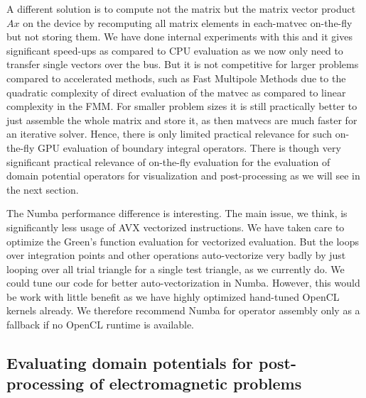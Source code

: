 A different solution is to compute not the matrix but the matrix vector product $Ax$ on the device by recomputing all matrix elements in each-matvec on-the-fly but not storing them. We have done internal experiments with this and it gives significant speed-ups as compared to CPU evaluation as we now only need to transfer single vectors over the bus. But it is not competitive for larger problems compared to accelerated methods, such as Fast Multipole Methods due to the quadratic complexity of direct evaluation of the matvec as compared to linear complexity in the FMM. For smaller problem sizes it is still practically better to just assemble the whole matrix and store it, as then matvecs are much faster for an iterative solver. Hence, there is only limited practical relevance for such on-the-fly GPU evaluation of boundary integral operators. There is though very significant practical relevance of on-the-fly evaluation for the evaluation of domain potential operators for visualization and post-processing as we will see in the next section.

The Numba performance difference is interesting. The main issue, we think, is significantly less usage of AVX vectorized instructions. We have taken care to optimize the Green's function evaluation for vectorized evaluation. But the loops over integration points and other operations auto-vectorize very badly by just looping over all trial triangle for a single test triangle, as we currently do. We could tune our code for better auto-vectorization in Numba. However, this would be work with little benefit as we have highly optimized hand-tuned OpenCL kernels already. We therefore recommend Numba for operator assembly only as a fallback if no OpenCL runtime is available.

\subsection{Evaluating domain potentials for post-processing of electromagnetic problems}

